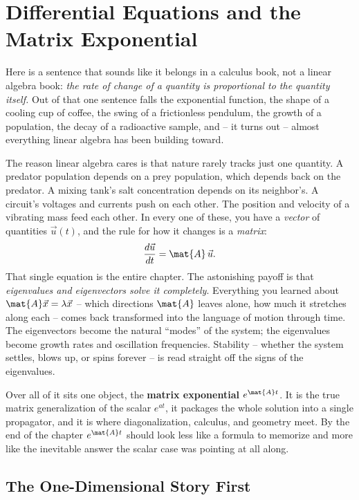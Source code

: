 \chapter{Differential Equations and the Matrix Exponential}

Here is a sentence that sounds like it belongs in a calculus book, not a linear
algebra book: \emph{the rate of change of a quantity is proportional to the
quantity itself.} Out of that one sentence falls the exponential function, the
shape of a cooling cup of coffee, the swing of a frictionless pendulum, the
growth of a population, the decay of a radioactive sample, and -- it turns out --
almost everything linear algebra has been building toward.

The reason linear algebra cares is that nature rarely tracks just one quantity.
A predator population depends on a prey population, which depends back on the
predator. A mixing tank's salt concentration depends on its neighbor's. A
circuit's voltages and currents push on each other. The position and velocity of
a vibrating mass feed each other. In every one of these, you have a \emph{vector}
of quantities $\vec{u}(t)$, and the rule for how it changes is a \emph{matrix}:
\[
  \frac{d\vec{u}}{dt} = \mat{A}\,\vec{u}.
\]
That single equation is the entire chapter. The astonishing payoff is that
\emph{eigenvalues and eigenvectors solve it completely}. Everything you learned
about $\mat{A}\vec{x} = \lambda\vec{x}$ -- which directions $\mat{A}$ leaves
alone, how much it stretches along each -- comes back transformed into the
language of motion through time. The eigenvectors become the natural ``modes''
of the system; the eigenvalues become growth rates and oscillation frequencies.
Stability -- whether the system settles, blows up, or spins forever -- is read
straight off the signs of the eigenvalues.

Over all of it sits one object, the \textbf{matrix
exponential} $e^{\mat{A}t}$. It is the true matrix generalization of the scalar
$e^{at}$, it packages the whole solution into a single propagator, and it is
where diagonalization, calculus, and geometry meet. By the end of the chapter
$e^{\mat{A}t}$ should look less like a formula to memorize and more like the
inevitable answer the scalar case was pointing at all along.

\section{The One-Dimensional Story First}
\label{ch25:scalar}

